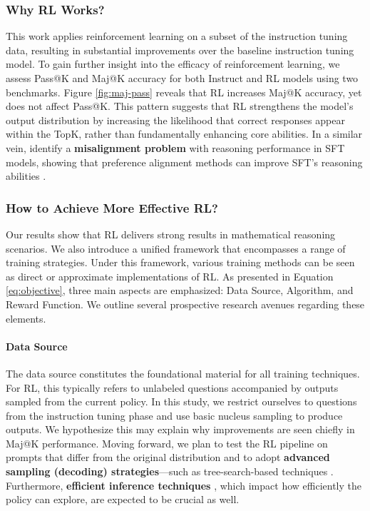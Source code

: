 \begin{itemize}[topsep=0pt]
\subsubsection{Why RL Works?} This work applies reinforcement learning on a subset of the instruction tuning data, resulting in substantial improvements over the baseline instruction tuning model. To gain further insight into the efficacy of reinforcement learning, we assess Pass@K and Maj@K accuracy for both Instruct and RL models using two benchmarks. Figure \ref{fig:maj-pass} reveals that RL increases Maj@K accuracy, yet does not affect Pass@K. This pattern suggests that RL strengthens the model’s output distribution by increasing the likelihood that correct responses appear within the TopK, rather than fundamentally enhancing core abilities. In a similar vein, \citep{wang2023making} identify a \textbf{misalignment problem} with reasoning performance in SFT models, showing that preference alignment methods can improve SFT’s reasoning abilities \citep{yuan2023rrhf,song2023preference,wang2023making}.

\subsubsection{How to Achieve More Effective RL?}
\label{sec:effec_rl}
Our results show that RL delivers strong results in mathematical reasoning scenarios. We also introduce a unified framework that encompasses a range of training strategies. Under this framework, various training methods can be seen as direct or approximate implementations of RL. As presented in Equation \ref{eq:objective}, three main aspects are emphasized: Data Source, Algorithm, and Reward Function. We outline several prospective research avenues regarding these elements.

\paragraph{Data Source} The data source constitutes the foundational material for all training techniques. For RL, this typically refers to unlabeled questions accompanied by outputs sampled from the current policy. In this study, we restrict ourselves to questions from the instruction tuning phase and use basic nucleus sampling to produce outputs. We hypothesize this may explain why improvements are seen chiefly in Maj@K performance. Moving forward, we plan to test the RL pipeline on prompts that differ from the original distribution and to adopt \textbf{advanced sampling (decoding) strategies}—such as tree-search-based techniques \citep{yao2023tree}. Furthermore, \textbf{efficient inference techniques} \citep{xia-etal-2023-speculative,leviathan2023fast,kwon2023efficient,xia2024unlocking}, which impact how efficiently the policy can explore, are expected to be crucial as well.


\end{itemize}
